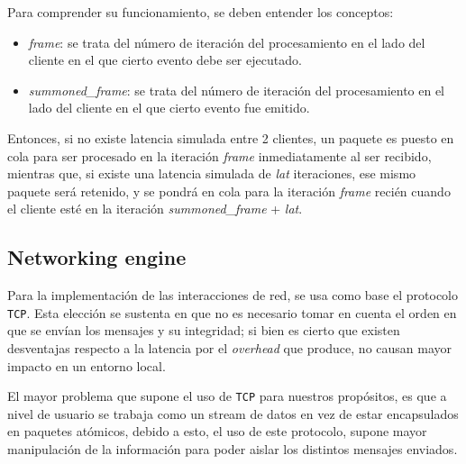 Para comprender su funcionamiento, se deben entender los conceptos:
\begin{itemize}
	\item \emph{frame}: se trata del número de iteración del procesamiento en el lado del cliente en el que cierto evento debe ser ejecutado.
	\item \emph{summoned\_frame}: se trata del número de iteración del procesamiento en el lado del cliente en el que cierto evento fue emitido.
\end{itemize}

Entonces, si no existe latencia simulada entre 2 clientes, un paquete es puesto en cola para ser procesado en la iteración \emph{frame} inmediatamente al ser recibido, mientras que, si existe una latencia simulada de \emph{lat} iteraciones, ese mismo paquete será retenido, y se pondrá en cola para la iteración \emph{frame} recién cuando el cliente esté en la iteración \emph{summoned\_frame} + \emph{lat}.






\subsection{Networking engine}
Para la implementación de las interacciones de red, se usa como base el protocolo \texttt{TCP}. Esta elección se sustenta en que no es necesario tomar en cuenta el orden en que se envían los mensajes y su integridad; si bien es cierto que existen desventajas respecto a la latencia por el \emph{overhead} que produce, no causan mayor impacto en un entorno local.

El mayor problema que supone el uso de \texttt{TCP} para nuestros propósitos, es que a nivel de usuario se trabaja como un stream de datos en vez de estar encapsulados en paquetes atómicos, debido a esto, el uso de este protocolo, supone mayor manipulación de la información para poder aislar los distintos mensajes enviados.

